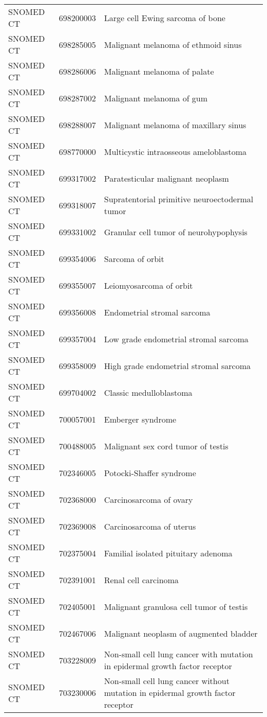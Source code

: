 \begin{longtable}{p{}p{}p{}}
  SNOMED CT & 698200003 & Large cell Ewing sarcoma of bone \\ 
  SNOMED CT & 698285005 & Malignant melanoma of ethmoid sinus \\ 
  SNOMED CT & 698286006 & Malignant melanoma of palate \\ 
  SNOMED CT & 698287002 & Malignant melanoma of gum \\ 
  SNOMED CT & 698288007 & Malignant melanoma of maxillary sinus \\ 
  SNOMED CT & 698770000 & Multicystic intraosseous ameloblastoma \\ 
  SNOMED CT & 699317002 & Paratesticular malignant neoplasm \\ 
  SNOMED CT & 699318007 & Supratentorial primitive neuroectodermal tumor \\ 
  SNOMED CT & 699331002 & Granular cell tumor of neurohypophysis \\ 
  SNOMED CT & 699354006 & Sarcoma of orbit \\ 
  SNOMED CT & 699355007 & Leiomyosarcoma of orbit \\ 
  SNOMED CT & 699356008 & Endometrial stromal sarcoma \\ 
  SNOMED CT & 699357004 & Low grade endometrial stromal sarcoma \\ 
  SNOMED CT & 699358009 & High grade endometrial stromal sarcoma \\ 
  SNOMED CT & 699704002 & Classic medulloblastoma \\ 
  SNOMED CT & 700057001 & Emberger syndrome \\ 
  SNOMED CT & 700488005 & Malignant sex cord tumor of testis \\ 
  SNOMED CT & 702346005 & Potocki-Shaffer syndrome \\ 
  SNOMED CT & 702368000 & Carcinosarcoma of ovary \\ 
  SNOMED CT & 702369008 & Carcinosarcoma of uterus \\ 
  SNOMED CT & 702375004 & Familial isolated pituitary adenoma \\ 
  SNOMED CT & 702391001 & Renal cell carcinoma \\ 
  SNOMED CT & 702405001 & Malignant granulosa cell tumor of testis \\ 
  SNOMED CT & 702467006 & Malignant neoplasm of augmented bladder \\ 
  SNOMED CT & 703228009 & Non-small cell lung cancer with mutation in epidermal growth factor receptor \\ 
  SNOMED CT & 703230006 & Non-small cell lung cancer without mutation in epidermal growth factor receptor \\ 

\end{longtable}
